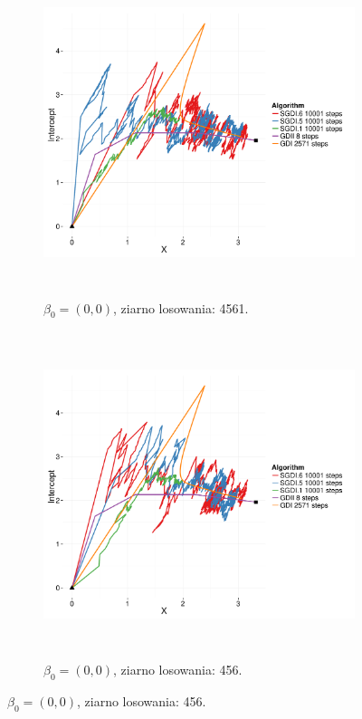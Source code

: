 \begin{figure}[hbt!]
  \begin{center}
   \begin{subfigure}[h!]{0.9\textwidth}
      \includegraphics[width=\textwidth, height=270pt]{Obrazki/sgd_00_1.pdf}
      \caption{$\beta_0 = (0,0)$, ziarno losowania: 4561.}
   \end{subfigure}     
   \begin{subfigure}[h!]{0.9\textwidth}
      \includegraphics[width=\textwidth, height=270pt]{Obrazki/sgd_00_2.pdf}
      \caption{$\beta_0 = (0,0)$, ziarno losowania: 456.}
   \end{subfigure}  \end{center}

\end{figure}
